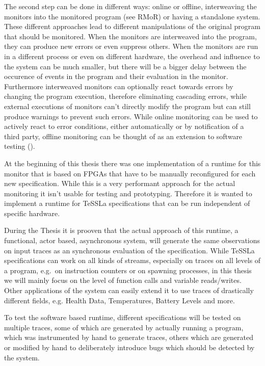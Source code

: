The second step can be done in different ways: online or offline, interweaving the monitors into the monitored program (see RMoR) or having a standalone system.
These different approaches lead to different manipulations of the original program that should be monitored.
When the monitors are interweaved into the program, they can produce new errors or even suppress others.
When the monitors are run in a different process or even on different hardware, the overhead and influence to the system can be much smaller,
but there will be a bigger delay between the occurence of events in the program and their evaluation in the monitor.
Furthermore interweaved monitors can optionally react towards errors by changing the program execution, therefore eliminating cascading errors,
while external executions of monitors can't directly modify the program but can still produce warnings to prevent such errors.
While online monitoring can be used to actively react to error conditions, either automatically or by notification of a third party,
offline monitoring can be thought of as an extension to software testing (\cite{DAngelo2005}).

At the beginning of this thesis there was one implementation of a runtime for this monitor that is based on FPGAs that have to be manually reconfigured for each new specification.
While this is a very performant approach for the actual monitoring it isn't usable for testing and prototyping.
Therefore it is wanted to implement a runtime for TeSSLa specifications that can be run independent of specific hardware.

During the Thesis it is prooven that the actual approach of this runtime, a functional, actor based, asynchronous system,
will generate the same observations on input traces as an synchronous evaluation of the specification.
While TeSSLa specifications can work on all kinds of streams, especially on traces on all levels of a program, e.g.\
on instruction counters or on spawning processes, in this thesis we will mainly focus on the level of function calls and variable reads/writes.
Other applications of the system can easily extend it to use traces of drastically different fields, e.g. Health Data, Temperatures, Battery Levels and more.

To test the software based runtime, different specifications will be tested on multiple traces, some of which are generated by actually running a program,
which was instrumented by hand to generate traces, others which are generated or modified by hand to deliberately introduce bugs which should be detected by the system.

